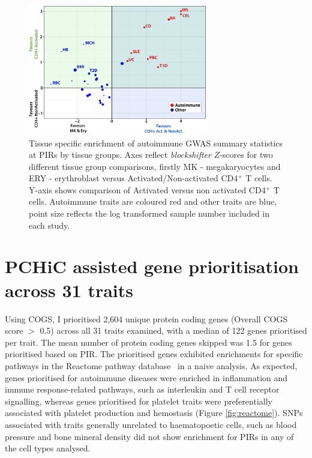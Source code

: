 \documentclass[a4paper,11pt]{report}
\begin{document}
\begin{figure}[h]
\centering
\includegraphics[width=0.7\textwidth]{tcell_blockshifter_scatter.pdf}
\caption{Tissue specific enrichment of autoimmune GWAS summary statistics at PIRs by tissue groups. Axes reflect \textit{blockshifter} $Z$-scores for two different tissue group comparisons, firstly MK - megakaryocytes and ERY - erythroblast versus Activated/Non-activated CD4$^{+}$ T cells. Y-axis shows comparison of Activated versus non activated CD4$^{+}$ T cells. Autoimmune traits are coloured red and other traits are blue, point size reflects the log transformed sample number included in each study.}
\label{fig:bs_2}
\end{figure}

\section{PCHiC assisted gene prioritisation across 31 traits}
\label{sect:tp_reactome}
Using COGS, I prioritised 2,604  unique protein coding genes (Overall COGS score $>$ 0.5) across all 31 traits examined, with a median of 122 genes prioritised per trait. The mean number of protein coding genes skipped was 1.5 for genes prioritised based on PIR. The prioritised genes exhibited enrichments for specific pathways in the Reactome pathway database~\citep{FabregatSidiropoulosGarapatiEtAl2016} in a naive analysis. As expected, genes prioritised for autoimmune diseases were enriched in inflammation and immune response-related pathways, such as interleukin and T cell receptor signalling, whereas genes prioritised for platelet traits were preferentially associated with platelet production and hemostasis (Figure \ref{fig:reactome}). SNPs associated with traits generally unrelated to haematopoetic cells, such as blood pressure and bone mineral density did not show enrichment for PIRs in any of the cell types analysed.
\end{document}
